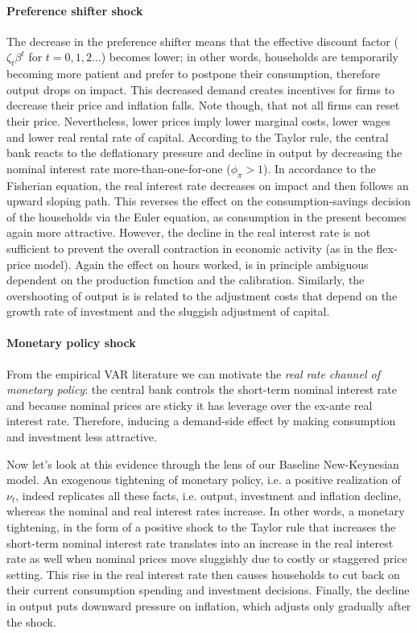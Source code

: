 \begin{enumerate}
\paragraph{Preference shifter shock}
The decrease in the preference shifter means that the effective discount factor ($\zeta_t \beta^t$ for $t=0,1,2...$) becomes lower;
  in other words, households are temporarily becoming more patient and prefer to postpone their consumption, therefore output drops on impact.
This decreased demand creates incentives for firms to decrease their price and inflation falls.
Note though, that not all firms can reset their price.
Nevertheless, lower prices imply lower marginal costs, lower wages and lower real rental rate of capital.
According to the Taylor rule, the central bank reacts to the deflationary pressure and decline in output
  by decreasing the nominal interest rate more-than-one-for-one ($\phi_\pi>1$).
In accordance to the Fisherian equation,
  the real interest rate decreases on impact and then follows an upward sloping path.
This reverses the effect on the consumption-savings decision of the households via the Euler equation,
  as consumption in the present becomes again more attractive.
However, the decline in the real interest rate is not sufficient to prevent the overall contraction in economic activity (as in the flex-price model).
Again the effect on hours worked, is in principle ambiguous dependent on the production function and the calibration.
Similarly, the overshooting of output is is related to the adjustment costs that depend on the growth rate of investment
  and the sluggish adjustment of capital.
  
\paragraph{Monetary policy shock}
From the empirical VAR literature we can motivate the \emph{real rate channel of monetary policy}:
  the central bank controls the short-term nominal interest rate and because nominal prices are sticky it has leverage over the ex-ante real interest rate.
Therefore, inducing a demand-side effect by making consumption and investment less attractive.
  
Now let's look at this evidence through the lens of our Baseline New-Keynesian model.
An exogenous tightening of monetary policy, i.e. a positive realization of $\nu_t$,
  indeed replicates all these facts, i.e. output, investment and inflation decline,
  whereas the nominal and real interest rates increase.
In other words, a monetary tightening, in the form of a positive shock to the Taylor rule
  that increases the short-term nominal interest rate translates into an increase in the real interest rate
  as well when nominal prices move sluggishly due to costly or staggered price setting.
This rise in the real interest rate then causes households to cut back on their current consumption spending and investment decisions.
Finally, the decline in output puts downward pressure on inflation, which adjusts only gradually after the shock.


\end{enumerate}
